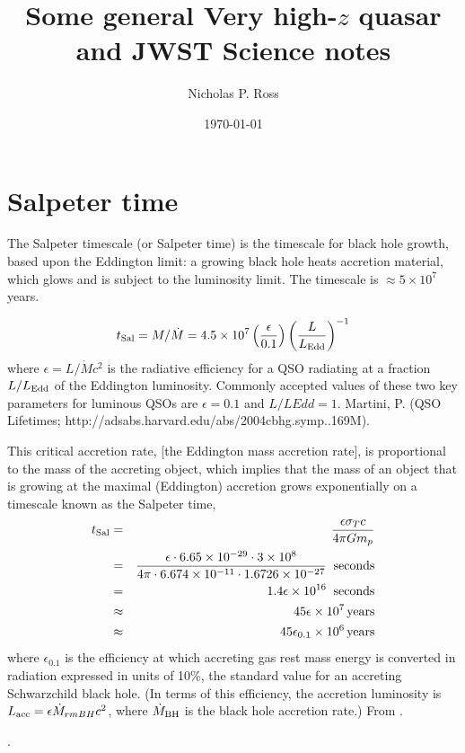 \documentclass[11pt]{article}
\begin{document}
\title{Some general Very high-$z$ quasar and JWST Science notes} 
\author{Nicholas P. Ross}
\date{\today}
\maketitle


\section*{Salpeter time}
The Salpeter timescale (or Salpeter time) is the timescale for black
hole growth, based upon the Eddington limit: a growing black hole
heats accretion material, which glows and is subject to the luminosity
limit. The timescale is $\approx 5 \times 10^{7}$ years. 



\begin{equation}
  t_{\rm Sal} = M/\dot{M} = 4.5 \times10^{7} \left( \frac{\epsilon}{0.1}\right ) \left( \frac{L}{L_{\rm Edd}}\right )^{-1}
\end{equation}
where $\epsilon = L/\dot{M} c^{2}$ is the radiative efficiency for a
QSO radiating at a fraction $L/L_{\rm Edd}$ of the Eddington
luminosity. Commonly accepted values of these two key parameters for
luminous QSOs are $\epsilon= 0.1$ and $L/LEdd = 1$.  Martini, P. (QSO
Lifetimes; http://adsabs.harvard.edu/abs/2004cbhg.symp..169M).

This critical accretion rate, [the Eddington mass accretion rate], is
proportional to the mass of the accreting object, which implies that
the mass of an object that is growing at the maximal (Eddington)
accretion grows exponentially on a timescale known as the Salpeter
time,
\begin{eqnarray}
  t_{\rm Sal} & = &  \frac{\epsilon \sigma_{T} c}{4\pi G m_{p}}  \\
              & = & \frac{\epsilon \cdot 6.65\times10^{-29}     \cdot           3\times10^{8}}
                    {4\pi       \cdot  6.674\times10^{-11}  \cdot  1.6726\times10^{-27} }  \;\; {\rm seconds}\\
              & = & 1.4 \epsilon \times 10^{16} \;\; {\rm seconds}\\
               & \approx & 45 \epsilon \times  10^7 \, {\rm years} \\
                 & \approx & 45 \epsilon_{0.1}\times  10^6 \, {\rm years}
\end{eqnarray}
where $\epsilon_{0.1}$ is the efficiency at which accreting
gas rest mass energy is converted in radiation expressed in units of
10\%, the standard value for an accreting Schwarzchild black hole. (In
terms of this efficiency, the accretion luminosity is $L_{\rm acc} =
\epsilon \dot{M}_{rm BH} c^{2}$, where $\dot{M}_{\rm BH}$ is the black hole
accretion rate.)
From \citep{Coppi2003}.


\citet{Salpeter64}.


\clearpage


\end{document}
